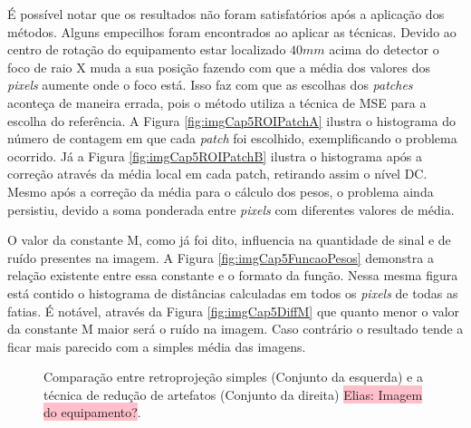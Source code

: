 É possível notar que os resultados não foram satisfatórios após a aplicação dos métodos. Alguns empecilhos foram encontrados ao aplicar as técnicas. Devido ao centro de rotação do equipamento estar localizado $40mm$ acima do detector o foco de raio X muda a sua posição fazendo com que a média dos valores dos \textit{pixels} aumente onde o foco está. Isso faz com que as escolhas dos \textit{patches} aconteça de maneira errada, pois o método utiliza a técnica de \acs{MSE} para a escolha do referência. A Figura \ref{fig:imgCap5ROIPatchA} ilustra o histograma do número de contagem em que cada \textit{patch} foi escolhido, exemplificando o problema ocorrido. Já a Figura \ref{fig:imgCap5ROIPatchB} ilustra o histograma após a correção através da média local em cada patch, retirando assim o nível DC. Mesmo após a correção da média para o cálculo dos pesos, o problema ainda persistiu, devido a soma ponderada entre \textit{pixels} com diferentes valores de média.

O valor da constante M, como já foi dito, influencia na quantidade de sinal e de ruído presentes na imagem. A Figura \ref{fig:imgCap5FuncaoPesos} demonstra a relação existente entre essa constante e o formato da função. Nessa mesma figura está contido o histograma de distâncias calculadas em todos os \textit{pixels} de todas as fatias. É notável, através da Figura \ref{fig:imgCap5DiffM} que quanto menor o valor da constante M maior será o ruído na imagem. Caso contrário o resultado tende a ficar mais parecido com a simples média das imagens. 

\begin{figure}[H]
	\centering
	
	\caption{Comparação entre retroprojeção simples (Conjunto da esquerda) e a técnica de redução de artefatos (Conjunto da direita)  \colorbox{pink}{Elias: Imagem do equipamento?}.}
	
	\hfill
	
	\hfill
	
	\hfill
	
	\label{fig:imgCap5ROIBP}
\end{figure}

